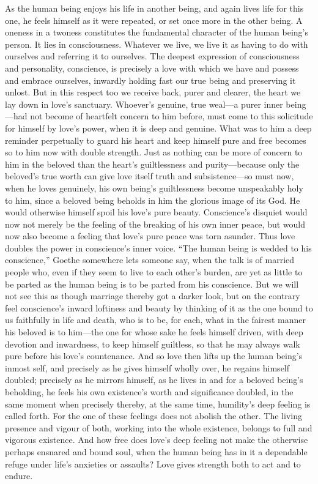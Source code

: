 \documentclass[12pt,a4paper]{book}
\begin{document}
As the human being enjoys his life in another being, and again lives life
for this one, he feels himself as it were repeated, or set once more in the
other being. A oneness in a twoness constitutes the fundamental character
of the human being's person. It lies in consciousness. Whatever we live, we
live it as having to do with ourselves and referring it to ourselves. The
deepest expression of consciousness and personality, conscience, is
precisely a love with which we have and possess and embrace ourselves,
inwardly holding fast our true being and preserving it unlost. But in this
respect too we receive back, purer and clearer, the heart we lay down in
love's sanctuary. Whoever's genuine, true weal---a purer inner being---had
not become of heartfelt concern to him before, must come to this solicitude
for himself by love's power, when it is deep and genuine. What was to him a
deep reminder perpetually to guard his heart and keep himself pure and free
becomes so to him now with double strength. Just as nothing can be more of
concern to him in the beloved than the heart's guiltlessness and
purity---because only the beloved's true worth can give love itself truth
and subsistence---so must now, when he loves genuinely, his own being's
guiltlessness become unspeakably holy to him, since a beloved being beholds
in him the glorious image of its God. He would otherwise himself spoil his
love's pure beauty. Conscience's disquiet would now not merely be the
feeling of the breaking of his own inner peace, but would now also become a
feeling that love's pure peace was torn asunder. Thus love doubles the
power in conscience's inner voice. ``The human being is wedded to his
conscience,'' Goethe somewhere lets someone say, when the talk is of
married people who, even if they seem to live to each other's burden, are
yet as little to be parted as the human being is to be parted from his
conscience. But we will not see this as though marriage thereby got a
darker look, but on the contrary feel conscience's inward loftiness and
beauty by thinking of it as the one bound to us faithfully in life and
death, who is to be, for each, what in the fairest manner his beloved is to
him---the one for whose sake he feels himself driven, with deep devotion and
inwardness, to keep himself guiltless, so that he may always walk pure
before his love's countenance. And so love then lifts up the human being's
inmost self, and precisely as he gives himself wholly over, he regains
himself doubled; precisely as he mirrors himself, as he lives in and for a
beloved being's beholding, he feels his own existence's worth and
significance doubled, in the same moment when precisely thereby, at the same
time, humility's deep feeling is called forth. For the one of these
feelings does not abolish the other. The living presence and vigour of
both, working into the whole existence, belongs to full and vigorous
existence. And how free does love's deep feeling not make the otherwise
perhaps ensnared and bound soul, when the human being has in it a
dependable refuge under life's anxieties or assaults? Love gives strength
both to act and to endure.
\end{document}
